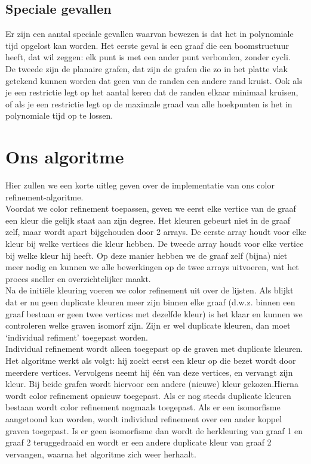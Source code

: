 \documentclass{article}
\begin{document}
\subsection{Speciale gevallen}
Er zijn een aantal speciale gevallen waarvan bewezen is dat het in polynomiale tijd opgelost kan worden. Het eerste geval is een graaf die een boomstructuur heeft, dat wil zeggen: elk punt is met een ander punt verbonden, zonder cycli.\\
De tweede zijn de planaire grafen, dat zijn de grafen die zo in het platte vlak getekend kunnen worden dat geen van de randen een andere rand kruist. Ook als je een restrictie legt op het aantal keren dat de randen elkaar minimaal kruisen, of als je een restrictie legt op de maximale graad van alle hoekpunten is het in polynomiale tijd op te lossen.
\pagebreak


\section{Ons algoritme}
Hier zullen we een korte uitleg geven over de implementatie van ons color refinement-algoritme.\\

Voordat we color refinement toepassen, geven we eerst elke vertice van de graaf een kleur die gelijk staat aan zijn degree. Het kleuren gebeurt niet in de graaf zelf, maar wordt apart bijgehouden door 2 arrays. De eerste array houdt voor elke kleur bij welke vertices die kleur hebben. De tweede array houdt voor elke vertice bij welke kleur hij heeft. Op deze manier hebben we de graaf zelf (bijna) niet meer nodig en kunnen we alle bewerkingen op de twee arrays uitvoeren, wat het proces sneller en overzichtelijker maakt.\\
Na de initi\"ele kleuring voeren we color refinement uit over de lijsten. Als blijkt dat er nu geen duplicate kleuren meer zijn binnen elke graaf (d.w.z. binnen een graaf bestaan er geen twee vertices met dezelfde kleur) is het klaar en kunnen we controleren welke graven isomorf zijn. Zijn er wel duplicate kleuren, dan moet `individual refiment' toegepast worden.\\

Individual refinement wordt alleen toegepast op de graven met duplicate kleuren. Het algoritme werkt als volgt: hij zoekt eerst een kleur op die bezet wordt door meerdere vertices. Vervolgens neemt hij \'e\'en van deze vertices, en vervangt zijn kleur. Bij beide grafen wordt hiervoor een andere (nieuwe) kleur gekozen.Hierna wordt color refinement opnieuw toegepast. Als er nog steeds duplicate kleuren bestaan wordt color refinement nogmaals toegepast. Als er een isomorfisme aangetoond kan worden, wordt individual refinement over een ander koppel graven toegepast. Is er geen isomorfisme dan wordt de herkleuring van graaf 1 en graaf 2 teruggedraaid en wordt er een andere duplicate kleur van graaf 2 vervangen, waarna het algoritme zich weer herhaalt. 
\pagebreak
\end{document}
